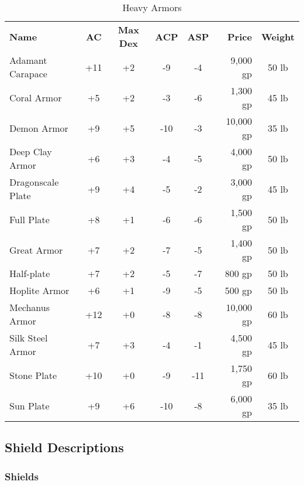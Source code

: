 \begin{table}[htb]
\caption{Heavy Armors}
\centering
\begin{tabular}{l *{4}{c} r c}
\textbf{Name} & \textbf{AC} & \textbf{Max Dex} & \textbf{ACP} & \textbf{ASP} & \textbf{Price} & \textbf{Weight}\\
Adamant Carapace & +11 & +2 & -9 & -4 & 9,000 gp & 50 lb\\
Coral Armor & +5 & +2 & -3 & -6 & 1,300 gp & 45 lb\\
Demon Armor & +9 & +5 & -10 & -3 & 10,000 gp & 35 lb\\
Deep Clay Armor & +6 & +3 & -4 & -5 & 4,000 gp & 50 lb\\
Dragonscale Plate & +9 & +4 & -5 & -2 & 3,000 gp & 45 lb\\
Full Plate & +8 & +1 & -6 & -6 & 1,500 gp & 50 lb\\
Great Armor & +7 & +2 & -7 & -5 & 1,400 gp & 50 lb\\
Half-plate & +7 & +2 & -5 & -7 & 800 gp & 50 lb\\
Hoplite Armor & +6 & +1 & -9 & -5 & 500 gp & 50 lb\\
Mechanus Armor & +12 & +0 & -8 & -8 & 10,000 gp & 60 lb\\
Silk Steel Armor & +7 & +3 & -4 & -1 & 4,500 gp & 45 lb\\
Stone Plate & +10 & +0 & -9 & -11 & 1,750 gp & 60 lb\\
Sun Plate & +9 & +6 & -10 & -8 & 6,000 gp & 35 lb\\
\end{tabular}
\end{table}


\subsection{Shield Descriptions}

\subsubsection{Shields}

